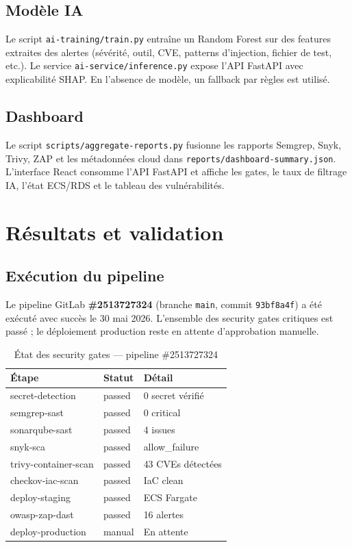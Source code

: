 \documentclass[12pt,a4paper]{report}
\begin{document}
\section{Modèle IA}
Le script \texttt{ai-training/train.py} entraîne un Random Forest sur des features extraites des alertes (sévérité, outil, CVE, patterns d'injection, fichier de test, etc.). Le service \texttt{ai-service/inference.py} expose l'API FastAPI avec explicabilité SHAP. En l'absence de modèle, un fallback par règles est utilisé.

\section{Dashboard}
Le script \texttt{scripts/aggregate-reports.py} fusionne les rapports Semgrep, Snyk, Trivy, ZAP et les métadonnées cloud dans \texttt{reports/dashboard-summary.json}. L'interface React consomme l'API FastAPI et affiche les gates, le taux de filtrage IA, l'état ECS/RDS et le tableau des vulnérabilités.

\chapter{Résultats et validation}
\label{ch:resultats}

\section{Exécution du pipeline}
Le pipeline GitLab \textbf{\#2513727324} (branche \texttt{main}, commit \texttt{93bf8a4f}) a été exécuté avec succès le 30 mai 2026. L'ensemble des security gates critiques est passé ; le déploiement production reste en attente d'approbation manuelle.

\begin{table}[H]
\centering
\small
\begin{tabular}{@{}lll@{}}
\toprule
\textbf{Étape} & \textbf{Statut} & \textbf{Détail} \\
\midrule
secret-detection & passed & 0 secret vérifié \\
semgrep-sast & passed & 0 critical \\
sonarqube-sast & passed & 4 issues \\
snyk-sca & passed & allow\_failure \\
trivy-container-scan & passed & 43 CVEs détectées \\
checkov-iac-scan & passed & IaC clean \\
deploy-staging & passed & ECS Fargate \\
owasp-zap-dast & passed & 16 alertes \\
deploy-production & manual & En attente \\
\bottomrule
\end{tabular}
\caption{État des security gates --- pipeline \#2513727324}
\label{tab:pipeline-results}
\end{table}
\end{document}
